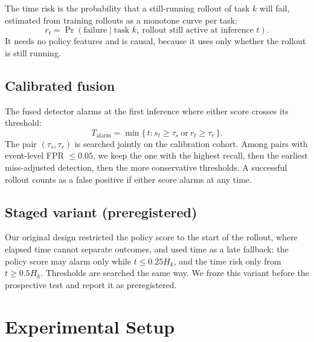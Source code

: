 \documentclass[conference,a4paper]{IEEEtran}
\begin{document}
The time risk is the probability that a still-running rollout of task $k$ will fail,
estimated from training rollouts as a monotone curve per task:
\begin{equation}
  r_t = \Pr(\text{failure} \mid \text{task } k,\ \text{rollout still active at inference } t).
\end{equation}
It needs no policy features and is causal, because it uses only whether the rollout is
still running.

\subsection{Calibrated fusion}

The fused detector alarms at the first inference where either score crosses its threshold:
\begin{equation}
  T_{\text{alarm}} = \min \{\, t : s_t \ge \tau_s \ \text{or}\ r_t \ge \tau_r \,\}.
\end{equation}
The pair $(\tau_s, \tau_r)$ is searched jointly on the calibration cohort. Among pairs with
event-level FPR $\le 0.05$, we keep the one with the highest recall, then the earliest
miss-adjusted detection, then the more conservative thresholds. A successful rollout counts
as a false positive if either score alarms at any time.

\subsection{Staged variant (preregistered)}

Our original design restricted the policy score to the start of the rollout, where elapsed
time cannot separate outcomes, and used time as a late fallback: the policy score may alarm
only while $t \le 0.25 H_k$, and the time risk only from $t \ge 0.5 H_k$. Thresholds are
searched the same way. We froze this variant before the prospective test and report it as
preregistered.

\section{Experimental Setup}
\end{document}
